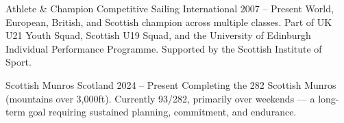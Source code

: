 

\begin{cventries}
  
\end{cventries}



\begin{cventries}

  \cventry
    {Athlete \& Champion} %
    {Competitive Sailing} %
    {International} %
    {2007 – Present} %
    {
      World, European, British, and Scottish champion across multiple classes. Part of UK U21 Youth Squad, Scottish U19 Squad, and the University of Edinburgh Individual Performance Programme. Supported by the Scottish Institute of Sport.
    }

  \cventry
    {} %
    {Scottish Munros} %
    {Scotland} %
    {2024 – Present} %
    {
      Completing the 282 Scottish Munros (mountains over 3,000ft). Currently 93/282, primarily over weekends — a long-term goal requiring sustained planning, commitment, and endurance.
    }


\end{cventries}
